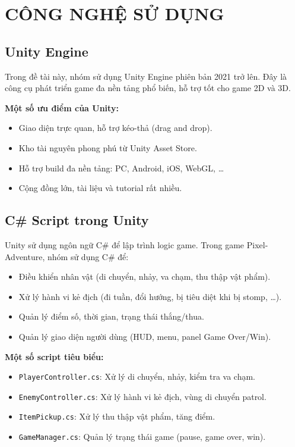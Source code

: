 \documentclass[a4paper,12pt]{article}
\begin{document}
\newpage

\section{CÔNG NGHỆ SỬ DỤNG}

\subsection{Unity Engine}

Trong đề tài này, nhóm sử dụng Unity Engine phiên bản 2021 trở lên. Đây là công cụ phát triển game đa nền tảng phổ biến, hỗ trợ tốt cho game 2D và 3D.

\textbf{Một số ưu điểm của Unity:}
\begin{itemize}
    \item Giao diện trực quan, hỗ trợ kéo-thả (drag and drop).
    \item Kho tài nguyên phong phú từ Unity Asset Store.
    \item Hỗ trợ build đa nền tảng: PC, Android, iOS, WebGL, \ldots
    \item Cộng đồng lớn, tài liệu và tutorial rất nhiều.
\end{itemize}

\subsection{C\# Script trong Unity}

Unity sử dụng ngôn ngữ C\# để lập trình logic game. Trong game Pixel-Adventure, nhóm sử dụng C\# để:
\begin{itemize}
    \item Điều khiển nhân vật (di chuyển, nhảy, va chạm, thu thập vật phẩm).
    \item Xử lý hành vi kẻ địch (đi tuần, đổi hướng, bị tiêu diệt khi bị stomp, \ldots).
    \item Quản lý điểm số, thời gian, trạng thái thắng/thua.
    \item Quản lý giao diện người dùng (HUD, menu, panel Game Over/Win).
\end{itemize}

\textbf{Một số script tiêu biểu:}
\begin{itemize}
    \item \texttt{PlayerController.cs}: Xử lý di chuyển, nhảy, kiểm tra va chạm.
    \item \texttt{EnemyController.cs}: Xử lý hành vi kẻ địch, vùng di chuyển patrol.
    \item \texttt{ItemPickup.cs}: Xử lý thu thập vật phẩm, tăng điểm.
    \item \texttt{GameManager.cs}: Quản lý trạng thái game (pause, game over, win).
\end{itemize}
\end{document}
